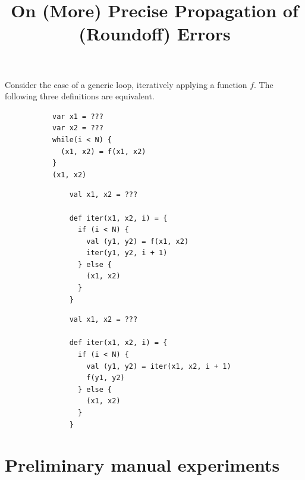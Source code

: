 \documentclass[10pt]{article}
\title{On (More) Precise Propagation of (Roundoff) Errors}
\author{}
\begin{document}
\maketitle

Consider the case of a generic loop, iteratively applying a function $f$.
The following three definitions are equivalent.
\begin{figure}[h!]
  \centering
  \lstset{numbers=none}
  \begin{subfigure}[b]{0.25\textwidth}
    \begin{lstlisting}
var x1 = ???
var x2 = ???
while(i < N) {
  (x1, x2) = f(x1, x2)
}
(x1, x2)
    \end{lstlisting}
  \end{subfigure}%
  \begin{subfigure}[b]{0.32\textwidth}
    \begin{lstlisting}
    val x1, x2 = ???

    def iter(x1, x2, i) = {
      if (i < N) {
        val (y1, y2) = f(x1, x2)
        iter(y1, y2, i + 1)
      } else {
        (x1, x2)
      }
    }
    \end{lstlisting}
  \end{subfigure}
  \begin{subfigure}[b]{0.32\textwidth}
    \begin{lstlisting}
    val x1, x2 = ???

    def iter(x1, x2, i) = {
      if (i < N) {
        val (y1, y2) = iter(x1, x2, i + 1)
        f(y1, y2)
      } else {
        (x1, x2)
      }
    }
    \end{lstlisting}
  \end{subfigure}
\end{figure}







\section{Preliminary manual experiments}
\end{document}
